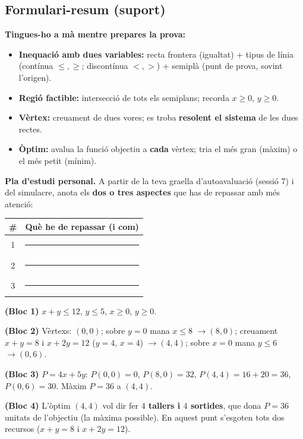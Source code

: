 \subsection{Formulari-resum (suport)}

\begin{idea}
\textbf{Tingues-ho a mà mentre prepares la prova:}
\begin{itemize}[leftmargin=1.4em, itemsep=2pt]
  \item \textbf{Inequació amb dues variables:} recta frontera (igualtat) + tipus de
        línia (contínua $\le,\ge$; discontínua $<,>$) + semiplà (punt de prova, sovint
        l'origen).
  \item \textbf{Regió factible:} intersecció de tots els semiplans; recorda
        $x\ge 0$, $y\ge 0$.
  \item \textbf{Vèrtex:} creuament de dues vores; es troba \textbf{resolent el
        sistema} de les dues rectes.
  \item \textbf{Òptim:} avalua la funció objectiu a \textbf{cada} vèrtex; tria el més
        gran (màxim) o el més petit (mínim).
\end{itemize}
\end{idea}

\noindent\textbf{Pla d'estudi personal.} A partir de la teva graella d'autoavaluació
(sessió 7) i del simulacre, anota els \textbf{dos o tres aspectes} que has de repassar
amb més atenció:
\begin{center}
\renewcommand{\arraystretch}{1.5}
\begin{tabular}{c p{10.5cm}}
\toprule
\textbf{\#} & \textbf{Què he de repassar (i com)} \\
\midrule
1 & \rule{9.8cm}{0.4pt} \\
2 & \rule{9.8cm}{0.4pt} \\
3 & \rule{9.8cm}{0.4pt} \\
\bottomrule
\end{tabular}
\end{center}

\begin{solucions}
\begin{sollist}
  \item \textbf{(Bloc 1)} $x+y\le 12$, \;$y\le 5$, \;$x\ge 0$, \;$y\ge 0$.
  \item \textbf{(Bloc 2)} Vèrtexs: $(0,0)$; sobre $y=0$ mana $x\le 8$ $\rightarrow
        (8,0)$; creuament $x+y=8$ i $x+2y=12$ ($y=4$, $x=4$) $\rightarrow (4,4)$; sobre
        $x=0$ mana $y\le 6$ $\rightarrow (0,6)$.
  \item \textbf{(Bloc 3)} $P=4x+5y$: $P(0,0)=0$, $P(8,0)=32$, $P(4,4)=16+20=36$,
        $P(0,6)=30$. Màxim $P=36$ a $(4,4)$.
  \item \textbf{(Bloc 4)} L'òptim $(4,4)$ vol dir fer \textbf{$4$ tallers i $4$
        sortides}, que dona $P=36$ unitats de l'objectiu (la màxima possible). En aquest
        punt s'esgoten tots dos recursos ($x+y=8$ i $x+2y=12$).
\end{sollist}
\end{solucions}
